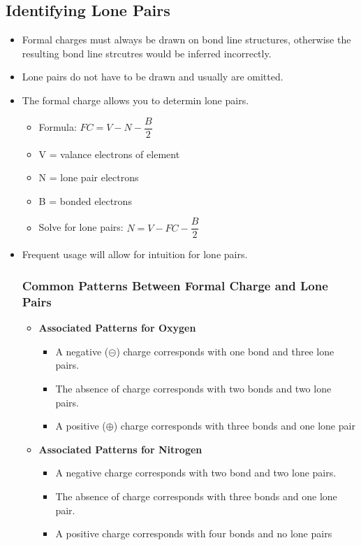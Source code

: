 \documentclass[12pt,a4paper]{article}
\begin{document}
\subsection{Identifying Lone Pairs}
\begin{itemize}
    \item Formal charges must always be drawn on bond line structures, otherwise the resulting bond line strcutres would be inferred incorrectly.
    \item Lone pairs do not have to be drawn and usually are omitted.
    \item The formal charge allows you to determin lone pairs.
        \begin{itemize}
            \item Formula: \(FC = V - N - \dfrac{B}{2}\)
            \item V = valance electrons of element
            \item N = lone pair electrons
            \item B = bonded electrons
            \item Solve for lone pairs: {\color{o-Sun}\(N = V - FC - \dfrac{B}{2}\)}
        \end{itemize}
    \item Frequent usage will allow for intuition for lone pairs.
    \subsubsection{Common Patterns Between Formal Charge and Lone Pairs}
    \begin{itemize}
        \item \textbf{Associated Patterns for Oxygen}
            \begin{itemize}
                \item A {\color{neg}negative ($\circleddash$)} charge corresponds with {\color{o-Sun}one bond} and {\color{o-Sun}three lone pairs}.
                \item The {\color{G-Moon}absence} of charge corresponds with {\color{o-Sun}two bonds} and {\color{o-Sun}two lone pairs}.
                \item A {\color{pos}positive ($\oplus$)} charge corresponds with {\color{o-Sun}three bonds} and {\color{o-Sun}one lone pair} 
            \end{itemize}
        \item \textbf{Associated Patterns for Nitrogen}
            \begin{itemize}
                \item A {\color{neg}negative} charge corresponds with {\color{o-Sun}two bond} and {\color{o-Sun}two lone pairs}.
                \item The {\color{G-Moon}absence} of charge corresponds with {\color{o-Sun}three bonds} and {\color{o-Sun}one lone pair}.
                \item A {\color{pos}positive} charge corresponds with {\color{o-Sun}four bonds} and {\color{o-Sun}no lone pairs} 
            \end{itemize}
    \end{itemize}
\end{itemize}
\end{document}
